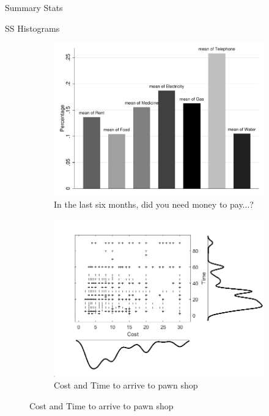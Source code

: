\documentclass[9pt]{beamer}
\begin{document}
\begin{frame}{Summary Stats}
    \begin{table}
        \begin{center}
        \tiny{}
        \end{center}
    \end{table}
\end{frame}





\begin{frame}{SS Histograms}

\begin{figure}[H]
    \label{nochoicehte_takeup_pred}
    \begin{center}
     \begin{subfigure}{0.40\textwidth}
        \caption{In the last six months, did you need money to pay...?}
        \centering
        \includegraphics[width=\textwidth]{Figuras/perc_utilities.pdf}
    \end{subfigure}
     \begin{subfigure}{0.5\textwidth}
        \caption{Cost and Time to arrive to pawn shop}
        \centering
        \includegraphics[width=\textwidth]{Figuras/cost_time_scatter_hist.png}
    \end{subfigure}
    \end{center}
    \end{figure}
    

\end{frame}
\end{document}
